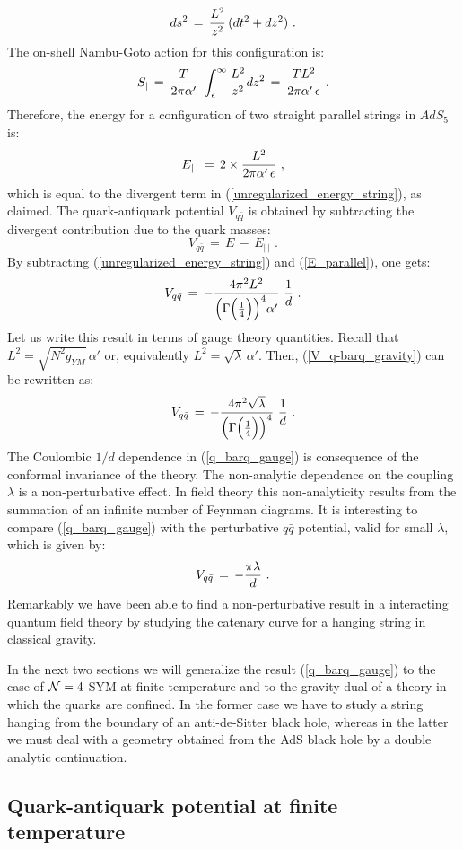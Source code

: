 \documentclass[12pt,notitlepage]{article}
\newcommand{\beq}{\begin{equation}}
\newcommand{\eeq}{\end{equation}}
\begin{document}
\beq
ds^2\,=\,{L^2\over z^2}\,(dt^2+dz^2)\,\,.
\eeq
The on-shell Nambu-Goto action for this configuration is:
\beq
S_{|}\,=\,{T\over 2\pi\alpha'}\,\,\int_{\epsilon}^{\infty} {L^2\over z^2} dz^2\,=\,
{TL^2\over  2\pi\alpha'\,\epsilon}\,\,.
\eeq
Therefore, the energy for a configuration of two straight parallel strings in $AdS_5$ is:
\beq
E_{|\,|}\,=\,2\times {L^2\over  2\pi\alpha'\,\epsilon}\,\,,
\label{E_parallel}
\eeq
which is equal to the divergent term in (\ref{unregularized_energy_string}), as claimed. 
The quark-antiquark potential $V_{q\bar q}$ is obtained by subtracting the divergent contribution due to the quark masses:
\beq
V_{q\bar q}\,=\,E\,-\,E_{|\,|}\,\,.
\eeq
By subtracting (\ref{unregularized_energy_string}) and (\ref{E_parallel}), one gets:
\beq
V_{q\bar q}\,=\,-{4\pi^2 L^2\over \Big(\Gamma\Big({1\over 4}\Big)\Big)^4
\alpha'}\,\,{1\over d}\,\,.
\label{V_q-barq_gravity}
\eeq
Let us write this result in terms of gauge theory quantities. Recall that 
$L^2=\sqrt{N^2 g_{YM}}\,\alpha'$ or, equivalently $L^2=\sqrt{\lambda}\,\alpha'$. Then, (\ref{V_q-barq_gravity}) can be rewritten as:
\beq
V_{q\bar q}\,=\,-{4\pi^2 \sqrt{\lambda}\over \Big(\Gamma\Big({1\over 4}\Big)\Big)^4 }\,\,{1\over d}\,\,.
\label{q_barq_gauge}
\eeq
The Coulombic $1/d$ dependence in (\ref{q_barq_gauge}) is consequence of the conformal invariance of the theory. The non-analytic dependence on the coupling $\lambda$ is a non-perturbative effect. In field theory this non-analyticity  results from the summation of an infinite number of Feynman diagrams. It is interesting to compare (\ref{q_barq_gauge}) with the perturbative $q\bar q$ potential, valid for small $\lambda$, which is given by:
\beq
V_{q\bar q}\,=\,-{\pi\lambda\over d}\,\,.
\eeq
Remarkably we have been able to find a non-perturbative result in a interacting quantum field theory by studying the catenary curve for a hanging string in classical gravity. 

In the next two sections we will generalize the result (\ref{q_barq_gauge}) to the case of ${\cal N}=4$ SYM at finite temperature and to the gravity dual of a theory in which the quarks are confined. In the former case we have to study a string hanging from the boundary of an anti-de-Sitter black hole, whereas in the latter we must deal with a geometry obtained from the AdS black hole by a double analytic continuation. 



\subsection{Quark-antiquark potential at finite temperature}
\end{document}
